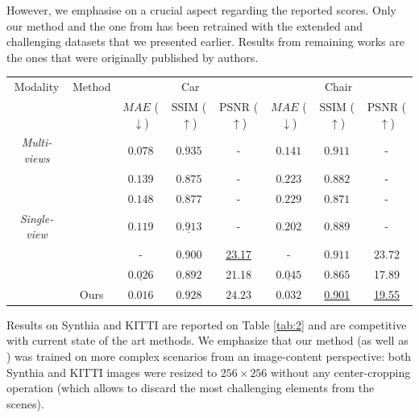 However, we emphasise on a crucial aspect regarding the reported scores. Only our method and the one from \citep{kim2020novel} has been retrained with the extended and challenging datasets that we presented earlier. Results from remaining works \citep{tatarchenko2015single,zhou2016view,park2017transformation,sun2018multiview,} are the ones that were originally published by authors. 
\begin{table}[htp!]
\begin{center}
\begin{adjustbox}{max width=\textwidth}
\begin{tabular}[h]{c||ccccccc}
\hline
Modality & Method & \multicolumn{3}{c}{Car} & \multicolumn{3}{c}{Chair} \\
 & & $MAE$ ($\downarrow$) & SSIM ($\uparrow$) & PSNR ($\uparrow$) & $MAE$ ($\downarrow$) & SSIM ($\uparrow$) & PSNR ($\uparrow$) \\
\hline
\textit{Multi-views} &\citep{sun2018multiview} & $0.078$ & ${0.935}$ & - & $0.141$ & ${0.911}$ & -\\
\hline
& \citep{tatarchenko2015single} & $0.139$ & $0.875$ & - & $0.223$ & $0.882$ & -\\
&\citep{zhou2016view} & $0.148$ & $0.877$ & - & $0.229$ & $0.871$ & - \\
\textit{Single-view} &\citep{park2017transformation} & $0.119$ & $\underline{0.913}$ & - & $0.202$ & 0.889& -\\
& \citep{yu2021pixelnerf} & - & 0.900 & \underline{23.17} & - & $\mathbf{0.911}$ & $\mathbf{23.72}$ \\
&\citep{kim2020novel} & $\underline{0.026}$ & $0.892$ & 21.18 & $\underline{0.045}$ & $0.865$ & 17.89\\
& Ours & $\mathbf{0.016}$ & $\mathbf{0.928}$ & $\mathbf{24.23}$ & $\mathbf{0.032}$ & \underline{0.901}& \underline{19.55}\\
\hline \hline

\end{tabular}
\end{adjustbox}
\end{center}
\label{tab:1}
\end{table}

 Results on Synthia \citep{ros2016synthia} and KITTI \citep{geiger2012we} are reported on Table \ref{tab:2} and are competitive with current state of the art methods. We emphasize that our method (as well as \citep{kim2020novel}) was trained on more complex scenarios from an image-content perspective: both Synthia and KITTI images were resized to $256\times 256$ without any center-cropping operation (which allows to discard the most challenging elements from the scenes). 

